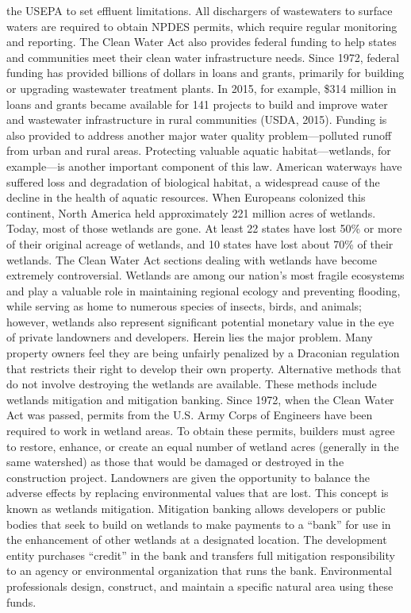 \documentclass{article}
\begin{document}
the USEPA to set effluent limitations. All dischargers of wastewaters to
surface waters are required to obtain NPDES permits, which require
regular monitoring and reporting. The Clean Water Act also provides
federal funding to help states and communities meet their clean water
infrastructure needs. Since 1972, federal funding has provided billions
of dollars in loans and grants, primarily for building or upgrading
wastewater treatment plants. In 2015, for example, \$314 million in
loans and grants became available for 141 projects to build and improve
water and wastewater infrastructure in rural communities (USDA, 2015).
Funding is also provided to address another major water quality
problem---polluted runoff from urban and rural areas. Protecting
valuable aquatic habitat---wetlands, for example---is another important
component of this law. American waterways have suffered loss and
degradation of biological habitat, a widespread cause of the decline in
the health of aquatic resources. When Europeans colonized this
continent, North America held approximately 221 million acres of
wetlands. Today, most of those wetlands are gone. At least 22 states
have lost 50\% or more of their original acreage of wetlands, and 10
states have lost about 70\% of their wetlands. The Clean Water Act
sections dealing with wetlands have become extremely controversial.
Wetlands are among our nation's most fragile ecosystems and play a
valuable role in maintaining regional ecology and preventing flooding,
while serving as home to numerous species of insects, birds, and
animals; however, wetlands also represent significant potential monetary
value in the eye of private landowners and developers. Herein lies the
major problem. Many property owners feel they are being unfairly
penalized by a Draconian regulation that restricts their right to
develop their own property. Alternative methods that do not involve
destroying the wetlands are available. These methods include wetlands
mitigation and mitigation banking. Since 1972, when the Clean Water Act
was passed, permits from the U.S. Army Corps of Engineers have been
required to work in wetland areas. To obtain these permits, builders
must agree to restore, enhance, or create an equal number of wetland
acres (generally in the same watershed) as those that would be damaged
or destroyed in the construction project. Landowners are given the
opportunity to balance the adverse effects by replacing environmental
values that are lost. This concept is known as wetlands mitigation.
Mitigation banking allows developers or public bodies that seek to build
on wetlands to make payments to a ``bank'' for use in the enhancement of
other wetlands at a designated location. The development entity
purchases ``credit'' in the bank and transfers full mitigation
responsibility to an agency or environmental organization that runs the
bank. Environmental professionals design, construct, and maintain a
specific natural area using these funds.
\end{document}
